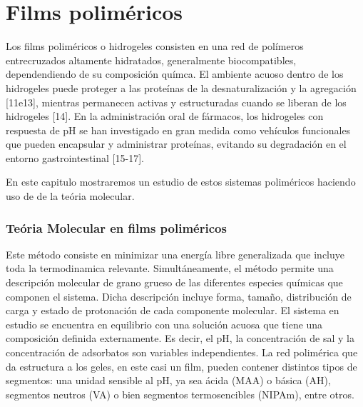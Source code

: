 
\chapter{Films polim\'ericos} %

\label{Chapter2} %



Los films polim\'ericos o hidrogeles  consisten en una red de pol\'imeros entrecruzados altamente hidratados, generalmente biocompatibles, dependendiendo de su composici\'on qu\'imca. El ambiente acuoso dentro de los hidrogeles puede proteger a las prote\'inas de la desnaturalización y la agregaci\'on [11e13], mientras permanecen activas y estructuradas cuando se liberan de los hidrogeles [14]. En la administraci\'on oral de f\'armacos, los hidrogeles con respuesta de pH se han investigado en gran medida como veh\'iculos funcionales que pueden encapsular y administrar prote\'inas, evitando su degradaci\'on en el entorno gastrointestinal [15-17].


En este capitulo mostraremos un estudio  de estos sistemas polim\'ericos haciendo uso de de la te\'oria molecular.



\subsection{Te\'oria Molecular en films polim\'ericos}


Este método consiste en minimizar una energía libre generalizada que incluye toda la termodinamica relevante.
Simultáneamente, el método permite una descripción molecular de grano grueso de las diferentes especies químicas que componen el sistema.
Dicha descripción incluye forma, tamaño, distribución de carga y estado de protonación de cada componente molecular.
El sistema en estudio se encuentra en  equilibrio con una solución acuosa que tiene una composición  definida externamente.
Es decir, el pH, la concentración de sal y la concentración de adsorbatos son variables independientes.
La red polimérica que da estructura a los geles, en este casi un film, pueden contener distintos tipos de segmentos: una unidad sensible al pH, ya sea ácida (MAA) o básica (AH), segmentos neutros (VA) o bien segmentos termosencibles (NIPAm), entre otros. 


